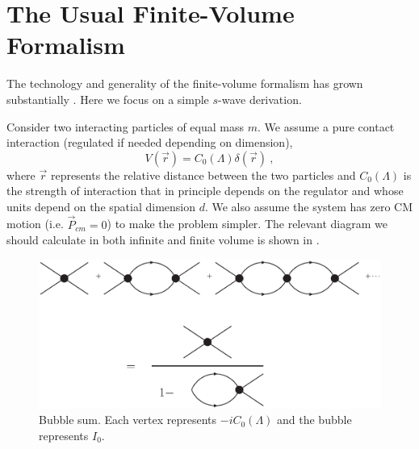 \section{The Usual \Luscher Finite-Volume Formalism}\label{sec:formalism/spherical}

The technology and generality of the \Luscher finite-volume formalism has grown substantially .  Here we focus on a simple $s$-wave derivation.

Consider two interacting particles of equal mass $m$.
We assume a pure contact interaction (regulated if needed depending on dimension),
\begin{equation}
V(\vec{r})=C_0(\Lambda)\delta(\vec{r})\ ,
\end{equation}
where $\vec{r}$ represents the relative distance between the two particles and $C_0(\Lambda)$ is the strength of interaction that in principle depends on the regulator and whose units depend on the spatial dimension $d$.  We also assume the system has zero CM motion (i.e. $\vec{P}_{cm}=0$) to make the problem simpler.
The relevant diagram we should calculate in both infinite and finite volume is shown in .

\begin{figure}[ht!]
\center
\includegraphics[width=.8\columnwidth]{figure/bubbleSum.eps}
\caption{Bubble sum. Each vertex represents $-iC_0(\Lambda)$ and the bubble represents $I_0$.\label{fig:bubbleSum}}
\end{figure}

